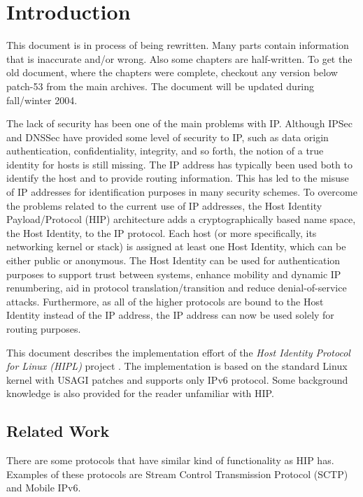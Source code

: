 \section{Introduction}
\label{sec:introduction}


{\large This document is in process of being rewritten. Many parts
contain information that is inaccurate and/or wrong. Also some
chapters are half-written.  To get the old document, where the
chapters were complete, checkout any version below patch-53 from the
main archives. The document will be updated during fall/winter 2004.}
\vspace{2in}

The lack of security has been one of the main problems with
IP. Although IPSec \cite{rfc2401} and DNSSec \cite{rfc3008} have
provided some level of security to IP, such as data origin
authentication, confidentiality, integrity, and so forth, the notion
of a true identity for hosts is still missing. The IP address has
typically been used both to identify the host and to provide routing
information. This has led to the misuse of IP addresses for
identification purposes in many security schemes. To overcome the
problems related to the current use of IP addresses, the Host Identity
Payload/Protocol (HIP) architecture adds a cryptographically based
name space, the Host Identity, to the IP protocol.  Each host (or more
specifically, its networking kernel or stack) is assigned at least one
Host Identity, which can be either public or anonymous. The Host
Identity can be used for authentication purposes to support trust
between systems, enhance mobility and dynamic IP renumbering, aid in
protocol translation/transition and reduce denial-of-service
attacks. Furthermore, as all of the higher protocols are bound to the
Host Identity instead of the IP address, the IP address can now be
used solely for routing purposes.

This document describes the implementation effort of the \textit{Host
Identity Protocol for Linux (HIPL)} project \cite{hipl}. The
implementation is based on the standard Linux kernel with USAGI
patches and supports only IPv6 protocol. Some background knowledge is
also provided for the reader unfamiliar with HIP.

\subsection{Related Work}
\label{sec:related_work}

There are some protocols that have similar kind of functionality as
HIP has. Examples of these protocols are Stream Control Transmission
Protocol (SCTP) and Mobile IPv6.

